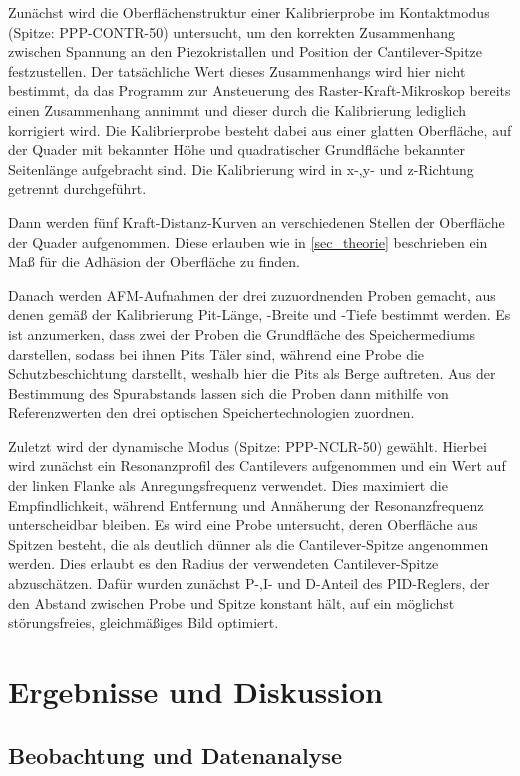 \documentclass[
	a4paper,
	12pt,
	pagesize,
	ngerman
]{scrartcl}
\begin{document}
	Zunächst wird die Oberflächenstruktur einer Kalibrierprobe im Kontaktmodus (Spitze: PPP-CONTR-50) untersucht, um den korrekten Zusammenhang zwischen Spannung an den Piezokristallen und Position der Cantilever-Spitze festzustellen.
	Der tatsächliche Wert dieses Zusammenhangs wird hier nicht bestimmt, da das Programm zur Ansteuerung des Raster-Kraft-Mikroskop bereits einen Zusammenhang annimmt und dieser durch die Kalibrierung lediglich korrigiert wird.
	Die Kalibrierprobe besteht dabei aus einer glatten Oberfläche, auf der Quader mit bekannter Höhe und quadratischer Grundfläche bekannter Seitenlänge aufgebracht sind.
	Die Kalibrierung wird in x-,y- und z-Richtung getrennt durchgeführt.

	Dann werden fünf Kraft-Distanz-Kurven an verschiedenen Stellen der Oberfläche der Quader aufgenommen.
	Diese erlauben wie in \cref{sec_theorie} beschrieben ein Maß für die Adhäsion der Oberfläche zu finden.

	Danach werden AFM-Aufnahmen der drei zuzuordnenden Proben gemacht, aus denen gemäß der Kalibrierung Pit-Länge, -Breite und -Tiefe bestimmt werden.
	Es ist anzumerken, dass zwei der Proben die Grundfläche des Speichermediums darstellen, sodass bei ihnen Pits Täler sind, während eine Probe die Schutzbeschichtung darstellt, weshalb hier die Pits als Berge auftreten.
	Aus der Bestimmung des Spurabstands lassen sich die Proben dann mithilfe von Referenzwerten den drei optischen Speichertechnologien zuordnen.

	Zuletzt wird der dynamische Modus (Spitze: PPP-NCLR-50) gewählt.
	Hierbei wird zunächst ein Resonanzprofil des Cantilevers aufgenommen und ein Wert auf der linken Flanke als Anregungsfrequenz verwendet.
	Dies maximiert die Empfindlichkeit, während Entfernung und Annäherung der Resonanzfrequenz unterscheidbar bleiben.
	Es wird eine Probe untersucht, deren Oberfläche aus Spitzen besteht, die als deutlich dünner als die Cantilever-Spitze angenommen werden.
	Dies erlaubt es den Radius der verwendeten Cantilever-Spitze abzuschätzen.
	Dafür wurden zunächst P-,I- und D-Anteil des PID-Reglers, der den Abstand zwischen Probe und Spitze konstant hält, auf ein möglichst störungsfreies, gleichmäßiges Bild optimiert.


	\section{Ergebnisse und Diskussion}


	\subsection{Beobachtung und Datenanalyse}
\end{document}
